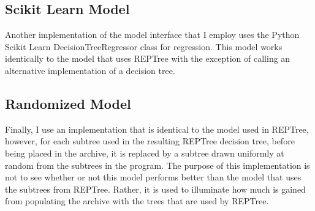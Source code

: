 \subsection{Scikit Learn Model}
Another implementation of the model interface that I employ uses the Python Scikit Learn DecisionTreeRegressor class for regression.  This model works identically to the model that uses REPTree with the exception of calling an alternative implementation of a decision tree.

\subsection{Randomized Model}
Finally, I use an implementation that is identical to the model used in REPTree, however, for each subtree used in the resulting REPTree decision tree, before being placed in the archive, it is replaced by a subtree drawn uniformly at random from the subtrees in the program.  The purpose of this implementation is not to see whether or not this model performs better than the model that uses the subtrees from REPTree.  Rather, it is used to illuminate how much is gained from populating the archive with the trees that are used by REPTree.
